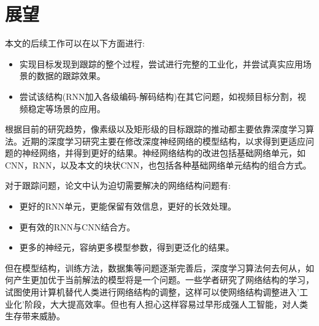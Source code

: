 \section{展望}
本文的后续工作可以在以下方面进行:
\begin{itemize}
    \item 实现目标发现到跟踪的整个过程，尝试进行完整的工业化，并尝试真实应用场景的数据的跟踪效果。
    \item 尝试该结构(RNN加入各级编码-解码结构)在其它问题，如视频目标分割，视频稳定等场景的应用。
\end{itemize}
\par
根据目前的研究趋势，像素级以及矩形级的目标跟踪的推动都主要依靠深度学习算法。近期的深度学习研究主要在修改深度神经网络的模型结构，以求得到更适应问题的神经网络，并得到更好的结果。神经网络结构的改进包括基础网络单元，如CNN，RNN，以及本文的块状CNN，也包括各种基础网络单元结构的组合方式。
\par
对于跟踪问题，论文中认为迫切需要解决的网络结构问题有:
\begin{itemize}
    \item 更好的RNN单元，更能保留有效信息，更好的长效处理。
    \item 更有效的RNN与CNN结合方。
    \item 更多的神经元，容纳更多模型参数，得到更泛化的结果。
\end{itemize}
\par
但在模型结构，训练方法，数据集等问题逐渐完善后，深度学习算法何去何从，如何产生更加优于当前解法的模型将是一个问题。一些学者研究了网络结构的学习\supercite{cortes2017adanet}，试图使用计算机替代人类进行网络结构的调整，这样可以使网络结构调整进入'工业化'阶段，大大提高效率。但也有人担心这样容易过早形成强人工智能\supercite{kurzweil2005singularity}，对人类生存带来威胁。

